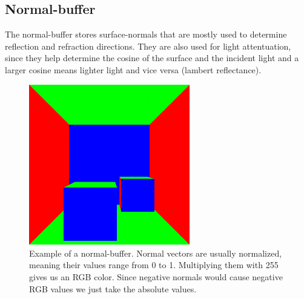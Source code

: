 \documentclass{ACGSeminar}
\begin{document}
	\subsection{Normal-buffer}
		The normal-buffer stores surface-normals that are mostly used to determine reflection and refraction directions. They are also used for light attentuation, since they help determine the cosine of the surface and the incident light and a larger cosine means lighter light and vice versa (lambert reflectance).
		\begin{figure}[htb!]%
			\begin{center}%
				\includegraphics[width=7cm]{img/normal_buffer.png}
			\end{center}%
			\caption{Example of a normal-buffer. Normal vectors are usually normalized, meaning their values range from 0 to 1. Multiplying them with 255 gives us an RGB color. Since negative normals
			would cause negative RGB values we just take the absolute values.}%
			\label{fig:normal_buffer}%
		\end{figure}%
\end{document}
